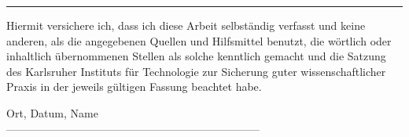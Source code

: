\documentclass[12pt,a4paper,twoside,bibliography=totocnumbered]{scrartcl}
\numberwithin{equation}{section}
\begin{document}

\vspace*{0pt}\vfill

\hrule\medskip

Hiermit versichere ich, dass ich diese Arbeit selbständig verfasst und keine anderen, als die angegebenen Quellen und Hilfsmittel benutzt, die wörtlich oder inhaltlich übernommenen Stellen als solche kenntlich gemacht und die Satzung des Karlsruher Instituts für Technologie zur Sicherung guter wissenschaftlicher Praxis in der jeweils gültigen Fassung beachtet habe.

\bigskip

\noindent
Ort, Datum, Name\\

---------------------------------------------------------------------


\vspace*{5cm}

\clearpage














\pagestyle{normal}
\renewcommand\sectionmark[1]{\markboth{\thesection\quad\MakeUppercase{#1}}{\thesection\quad\MakeUppercase{#1}}}
\renewcommand\subsectionmark[1]{\markright{\thesubsection\quad\MakeUppercase{#1}}}

\tableofcontents



\newcommand{\mergeStep}{\textsc{MergeStep}}
\newcommand{\boruvkaStep}{\textsc{Bor{\r u}vkaStep}}
\newcommand{\boruvka}{Bor{\r u}vka }
\newcommand{\boruvkasAlgorithmus}{Bor{\r u}vkas Algorithmus}
\newcommand{\boruvkaAllreduce}{\textsc{Bor{\r u}vka-Allreduce} }
\newcommand{\mergeMST}{\textsc{Merge-Local-MST} }
\newcommand{\boruvkaMixedMerge}{\textsc{Bor{\r u}vka-Mixed-Merge} }
\newcommand{\boruvkaThenMerge}{\textsc{Bor{\r u}vka-Then-Merge} }














\listoffigures
\newpage
\listofalgorithms

\clearpage




\printbibliography
\end{document}
